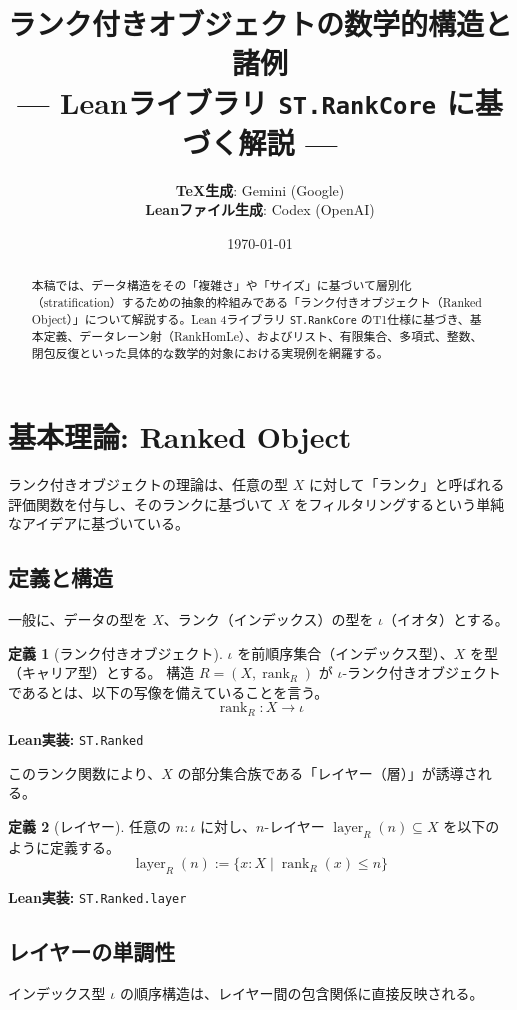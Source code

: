 \documentclass[a4paper,11pt]{article}
\title{\textbf{ランク付きオブジェクトの数学的構造と諸例}\\ \large --- Leanライブラリ \texttt{ST.RankCore} に基づく解説 ---}
\author{
    \textbf{TeX生成}: Gemini (Google) \\
    \textbf{Leanファイル生成}: Codex (OpenAI)
}
\date{\today}
\theoremstyle{definition}
\newtheorem{definition}{定義}[section]
\theoremstyle{plain}
\newcommand{\code}[1]{\texttt{#1}}
\newcommand{\rank}{\operatorname{rank}}
\newcommand{\layer}{\operatorname{layer}}
\begin{document}
\maketitle

\begin{abstract}
本稿では、データ構造をその「複雑さ」や「サイズ」に基づいて層別化（stratification）するための抽象的枠組みである「ランク付きオブジェクト（Ranked Object）」について解説する。Lean 4ライブラリ \code{ST.RankCore} のT1仕様に基づき、基本定義、データレーン射（RankHomLe）、およびリスト、有限集合、多項式、整数、閉包反復といった具体的な数学的対象における実現例を網羅する。
\end{abstract}

\tableofcontents

\section{基本理論: Ranked Object}

ランク付きオブジェクトの理論は、任意の型 $X$ に対して「ランク」と呼ばれる評価関数を付与し、そのランクに基づいて $X$ をフィルタリングするという単純なアイデアに基づいている。

\subsection{定義と構造}

一般に、データの型を $X$、ランク（インデックス）の型を $\iota$（イオタ）とする。

\begin{definition}[ランク付きオブジェクト]
$\iota$ を前順序集合（インデックス型）、$X$ を型（キャリア型）とする。
構造 $R = (X, \rank_R)$ が $\iota$-ランク付きオブジェクトであるとは、以下の写像を備えていることを言う。
\[
  \rank_R : X \to \iota
\]
\end{definition}

\noindent \textbf{Lean実装:} \code{ST.Ranked}

このランク関数により、$X$ の部分集合族である「レイヤー（層）」が誘導される。

\begin{definition}[レイヤー]
任意の $n : \iota$ に対し、$n$-レイヤー $\layer_R(n) \subseteq X$ を以下のように定義する。
\[
  \layer_R(n) := \{ x : X \mid \rank_R(x) \le n \}
\]
\end{definition}

\noindent \textbf{Lean実装:} \code{ST.Ranked.layer}

\subsection{レイヤーの単調性}
インデックス型 $\iota$ の順序構造は、レイヤー間の包含関係に直接反映される。
\end{document}
